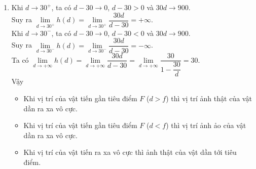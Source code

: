 \begin{bt}
{\begin{enumerate}
Vậy $d'=h(d) = \dfrac{30d}{d-30}$.
\item 
Khi $d\to 30^+$, ta có $d-30 \to 0$, $d-30 >0$ và $30d \to 900$.\\
Suy ra $\lim\limits _{d \rightarrow 30^{+}} h(d) = \lim\limits _{d \rightarrow 30^{+}} \dfrac{30d}{d-30} = +\infty$. \\
Khi $d\to 30^-$, ta có $d-30 \to 0$, $d-30 <0$ và $30d \to 900$.\\
Suy ra $\lim\limits _{d \rightarrow 30^{-}} h(d) = \lim\limits _{d \rightarrow 30^{-}} \dfrac{30d}{d-30} = -\infty$. \\
Ta có $\lim\limits _{d \rightarrow +\infty} h(d) =  \lim\limits _{d \rightarrow +\infty} \dfrac{30d}{d-30} = \lim\limits _{d \rightarrow +\infty}  \dfrac{30}{1-\dfrac{30}{d}} =30$. \\
Vậy 
\begin{itemize}
\item  Khi vị trí của vật tiến gần  tiêu điểm $F$ ($d >f$) thì vị trí ảnh thật của vật dần ra xa vô cực. 
\item  Khi vị trí của vật tiến gần  tiêu điểm $F$ ($d <f$) thì vị trí ảnh ảo của vật dần ra xa vô cực. 
\item  Khi vị trí của vật tiến ra xa vô cực thì  ảnh thật của vật dần tới tiêu điểm. 
\end{itemize}
\end{enumerate}
}
\end{bt}


